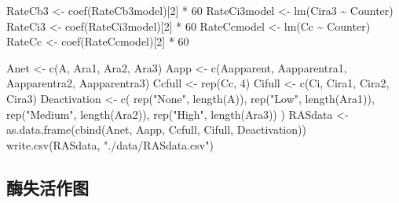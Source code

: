 \documentclass[
]{krantz}
\makeatletter
\newenvironment{Shaded}{\begin{snugshade}}{\end{snugshade}}
\newcommand{\DecValTok}[1]{\textcolor[rgb]{0.00,0.00,0.81}{#1}}
\newcommand{\FunctionTok}[1]{\textcolor[rgb]{0.00,0.00,0.00}{#1}}
\newcommand{\NormalTok}[1]{#1}
\newcommand{\OtherTok}[1]{\textcolor[rgb]{0.56,0.35,0.01}{#1}}
\newcommand{\SpecialCharTok}[1]{\textcolor[rgb]{0.00,0.00,0.00}{#1}}
\newcommand{\StringTok}[1]{\textcolor[rgb]{0.31,0.60,0.02}{#1}}
\newenvironment{kframe}{%
\medskip{}
\setlength{\fboxsep}{.8em}
 \def\at@end@of@kframe{}%
 \ifinner\ifhmode%
  \def\at@end@of@kframe{\end{minipage}}%
  \begin{minipage}{\columnwidth}%
 \fi\fi%
 \def\FrameCommand##1{\hskip\@totalleftmargin \hskip-\fboxsep
 \colorbox{shadecolor}{##1}\hskip-\fboxsep
     \hskip-\linewidth \hskip-\@totalleftmargin \hskip\columnwidth}%
 \MakeFramed {\advance\hsize-\width
   \@totalleftmargin\z@ \linewidth\hsize
   \@setminipage}}%
 {\par\unskip\endMakeFramed%
 \at@end@of@kframe}
\renewenvironment{Shaded}{\begin{kframe}}{\end{kframe}}
\makeatother
\begin{document}
\begin{Shaded}
\begin{Highlighting}[]
\NormalTok{RateCb3 }\OtherTok{\textless{}{-}} \FunctionTok{coef}\NormalTok{(RateCb3model)[}\DecValTok{2}\NormalTok{] }\SpecialCharTok{*} \DecValTok{60} 
\NormalTok{RateCi3model }\OtherTok{\textless{}{-}} \FunctionTok{lm}\NormalTok{(Cira3 }\SpecialCharTok{\textasciitilde{}}\NormalTok{ Counter)}
\NormalTok{RateCi3 }\OtherTok{\textless{}{-}} \FunctionTok{coef}\NormalTok{(RateCi3model)[}\DecValTok{2}\NormalTok{] }\SpecialCharTok{*} \DecValTok{60} 
\NormalTok{RateCcmodel }\OtherTok{\textless{}{-}} \FunctionTok{lm}\NormalTok{(Cc }\SpecialCharTok{\textasciitilde{}}\NormalTok{ Counter)}
\NormalTok{RateCc }\OtherTok{\textless{}{-}} \FunctionTok{coef}\NormalTok{(RateCcmodel)[}\DecValTok{2}\NormalTok{] }\SpecialCharTok{*} \DecValTok{60} 

\NormalTok{Anet }\OtherTok{\textless{}{-}} \FunctionTok{c}\NormalTok{(A, Ara1, Ara2, Ara3)}
\NormalTok{Aapp }\OtherTok{\textless{}{-}} \FunctionTok{c}\NormalTok{(Aapparent, Aapparentra1, Aapparentra2, Aapparentra3)}
\NormalTok{Ccfull }\OtherTok{\textless{}{-}} \FunctionTok{rep}\NormalTok{(Cc, }\DecValTok{4}\NormalTok{)}
\NormalTok{Cifull }\OtherTok{\textless{}{-}} \FunctionTok{c}\NormalTok{(Ci, Cira1, Cira2, Cira3)}
\NormalTok{Deactivation }\OtherTok{\textless{}{-}}
  \FunctionTok{c}\NormalTok{(}
    \FunctionTok{rep}\NormalTok{(}\StringTok{"None"}\NormalTok{, }\FunctionTok{length}\NormalTok{(A)),}
    \FunctionTok{rep}\NormalTok{(}\StringTok{"Low"}\NormalTok{, }\FunctionTok{length}\NormalTok{(Ara1)),}
    \FunctionTok{rep}\NormalTok{(}\StringTok{"Medium"}\NormalTok{, }\FunctionTok{length}\NormalTok{(Ara2)),}
    \FunctionTok{rep}\NormalTok{(}\StringTok{"High"}\NormalTok{, }\FunctionTok{length}\NormalTok{(Ara3))}
\NormalTok{  )}
\NormalTok{RASdata }\OtherTok{\textless{}{-}}
  \FunctionTok{as.data.frame}\NormalTok{(}\FunctionTok{cbind}\NormalTok{(Anet, Aapp, Ccfull, Cifull, Deactivation))}
\FunctionTok{write.csv}\NormalTok{(RASdata, }\StringTok{"./data/RASdata.csv"}\NormalTok{)}
\end{Highlighting}
\end{Shaded}

\hypertarget{multi9}{%
\subsection{酶失活作图}\label{multi9}}
\end{document}
